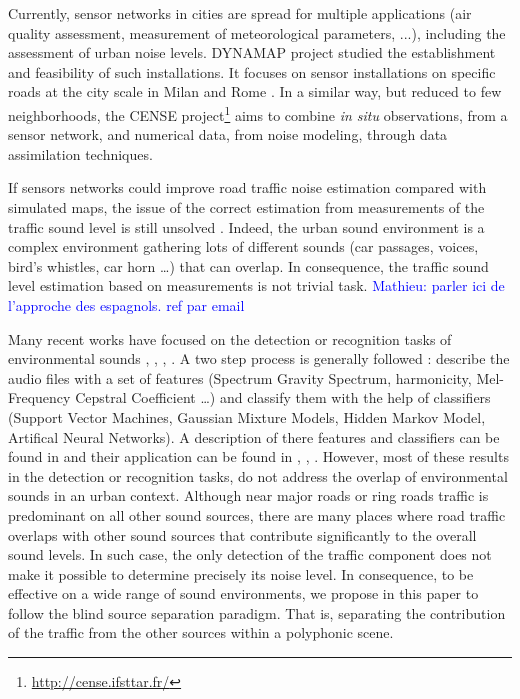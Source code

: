 \documentclass[twocolumn,a4paper,10pt]{article}
\newcommand{\ml}[1]{\textcolor{blue}{ Mathieu: #1}}
\begin{document}
Currently, sensor networks in cities are spread for multiple applications (air quality assessment, measurement of meteorological parameters, ...), including the assessment of urban noise levels. DYNAMAP project \cite{dynamap_2016} studied the establishment and feasibility of such installations. It focuses on sensor installations on specific roads at the city scale in Milan and Rome \cite{bellucci_life_2017}. In a similar way, but reduced to few neighborhoods, the CENSE project\footnote{\url{http://cense.ifsttar.fr/}} \cite{} aims to combine \textit{in situ} observations, from a sensor network, and numerical data, from noise modeling, through data assimilation techniques.

If sensors networks could improve road traffic noise estimation compared with simulated maps, the issue of the correct estimation from  measurements of the traffic sound level is still unsolved \cite{Mioduszewski}. Indeed, the urban sound environment is a complex environment gathering lots of different sounds (car passages, voices, bird's whistles, car horn \dots) that can overlap. In consequence, the traffic sound level estimation based on measurements is not trivial task. \ml{parler ici de l'approche des espagnols. ref par email}

Many recent works have focused on the detection  or recognition tasks of environmental sounds \cite{heittola_sound_2011},  \cite{defreville_automatic_2006},  \cite{dufaux_automatic_2000}, \cite{chu_environmental_2009}. A two step process is generally followed : describe the audio files with a set of features (Spectrum Gravity Spectrum, harmonicity, Mel-Frequency Cepstral Coefficient \dots) and classify them with the help of classifiers (Support Vector Machines, Gaussian Mixture Models, Hidden Markov Model, Artifical Neural Networks). A description of there features and classifiers can be found in \cite{cowling_comparison_2003} and their application can be found in \cite{shen_environmental_2012}, \cite{beritelli_pattern_2008}, \cite{couvreur_automatic_2004}.
However, most of these results in the detection or recognition tasks, do not address the overlap of environmental sounds in an urban context. Although near major roads or ring roads traffic is predominant on all other sound sources, there are many places where road traffic overlaps with other sound sources that contribute significantly to the overall sound levels. In such case, the only detection of the traffic component does not make it possible to determine precisely its noise level. In consequence, to be effective on a wide range of sound environments, we propose in this paper to follow the blind source separation paradigm. That is, separating the contribution of the traffic from the other sources within a polyphonic scene.
\end{document}
